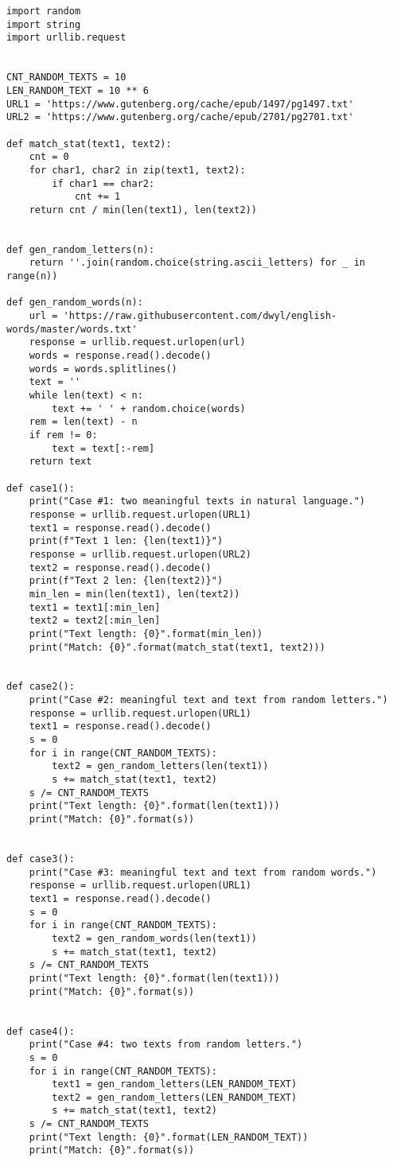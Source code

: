 \documentclass[a4paper,12pt]{article}
\begin{document}
\begin{lstlisting}
import random
import string
import urllib.request


CNT_RANDOM_TEXTS = 10
LEN_RANDOM_TEXT = 10 ** 6
URL1 = 'https://www.gutenberg.org/cache/epub/1497/pg1497.txt'
URL2 = 'https://www.gutenberg.org/cache/epub/2701/pg2701.txt'

def match_stat(text1, text2):
    cnt = 0
    for char1, char2 in zip(text1, text2):
        if char1 == char2:
            cnt += 1
    return cnt / min(len(text1), len(text2))


def gen_random_letters(n):
    return ''.join(random.choice(string.ascii_letters) for _ in range(n))

def gen_random_words(n):
    url = 'https://raw.githubusercontent.com/dwyl/english-words/master/words.txt'
    response = urllib.request.urlopen(url)
    words = response.read().decode()
    words = words.splitlines()
    text = ''
    while len(text) < n:
        text += ' ' + random.choice(words)
    rem = len(text) - n
    if rem != 0:
        text = text[:-rem]
    return text

def case1():
    print("Case #1: two meaningful texts in natural language.")
    response = urllib.request.urlopen(URL1)
    text1 = response.read().decode()
    print(f"Text 1 len: {len(text1)}")
    response = urllib.request.urlopen(URL2)
    text2 = response.read().decode()
    print(f"Text 2 len: {len(text2)}")
    min_len = min(len(text1), len(text2))
    text1 = text1[:min_len]
    text2 = text2[:min_len]
    print("Text length: {0}".format(min_len))
    print("Match: {0}".format(match_stat(text1, text2)))


def case2():
    print("Case #2: meaningful text and text from random letters.")
    response = urllib.request.urlopen(URL1)
    text1 = response.read().decode()
    s = 0
    for i in range(CNT_RANDOM_TEXTS):
        text2 = gen_random_letters(len(text1))
        s += match_stat(text1, text2)
    s /= CNT_RANDOM_TEXTS
    print("Text length: {0}".format(len(text1)))
    print("Match: {0}".format(s))


def case3():
    print("Case #3: meaningful text and text from random words.")
    response = urllib.request.urlopen(URL1)
    text1 = response.read().decode()
    s = 0
    for i in range(CNT_RANDOM_TEXTS):
        text2 = gen_random_words(len(text1))
        s += match_stat(text1, text2)
    s /= CNT_RANDOM_TEXTS
    print("Text length: {0}".format(len(text1)))
    print("Match: {0}".format(s))


def case4():
    print("Case #4: two texts from random letters.")
    s = 0
    for i in range(CNT_RANDOM_TEXTS):
        text1 = gen_random_letters(LEN_RANDOM_TEXT)
        text2 = gen_random_letters(LEN_RANDOM_TEXT)
        s += match_stat(text1, text2)
    s /= CNT_RANDOM_TEXTS
    print("Text length: {0}".format(LEN_RANDOM_TEXT))
    print("Match: {0}".format(s))



\end{lstlisting}
\end{document}
